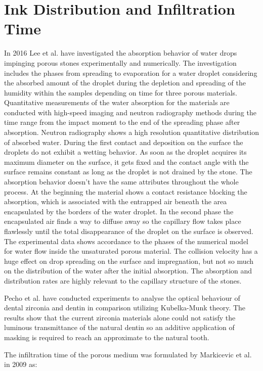 \section{Ink Distribution and Infiltration Time}
In 2016 Lee et al. have investigated the absorption behavior of water drops impinging porous stones experimentally and numerically. The investigation includes the phases from spreading to evaporation for a water droplet considering the absorbed amount of the droplet during the depletion and spreading of the humidity within the samples depending on time for three porous materials. Quantitative measurements of the water absorption for the materials are conducted with high-speed imaging and neutron radiography methods during the time range from the impact moment to the end of the spreading phase after absorption. Neutron radiography shows a high resolution quantitative distribution of absorbed water. During the first contact and deposition on the surface the droplets do not exhibit a wetting behavior.  As soon as the droplet acquires its maximum diameter on the surface, it gets fixed and the contact angle with the surface remains constant as long as the droplet is not drained by the stone. The absorption behavior doesn’t have the same attributes throughout the whole process. At the beginning the material shows a contact resistance blocking the absorption, which is associated with the entrapped air beneath the area encapsulated by the borders of the water droplet. In the second phase the encapsulated air finds a way to diffuse away so the capillary flow takes place flawlessly until the total disappearance of the droplet on the surface is observed. The experimental data shows accordance to the phases of the numerical model for water flow inside the unsaturated porous material. The collision velocity has a huge effect on drop spreading on the surface and impregnation, but not so much on the distribution of the water after the initial absorption. The absorption and distribution rates are highly relevant to the capillary structure of the stones.\citep{lee2016absorption}


Pecho et al. have conducted experiments to analyse the optical behaviour of dental zirconia and dentin in comparison utilizing Kubelka-Munk theory. The results show that the current zirconia materials alone could not satisfy the luminous transmittance of the natural dentin so an additive application of masking is required to reach an approximate to the natural tooth.\citep{pecho2015optical}

The infiltration time of the porous medium was formulated by Markicevic et al. in 2009 as:

